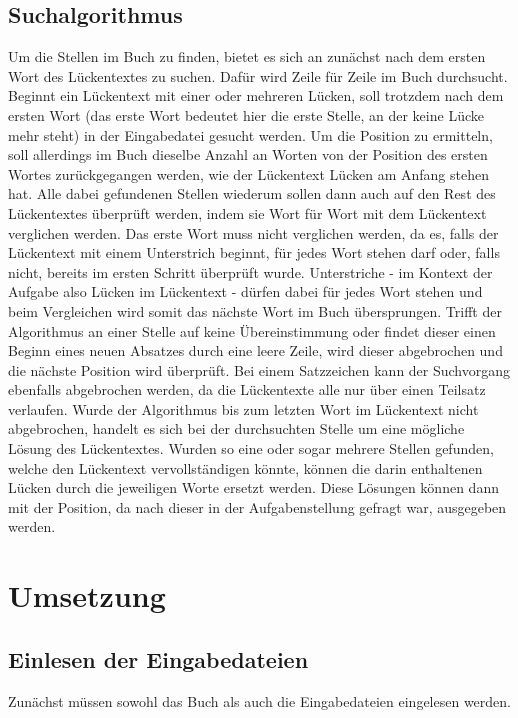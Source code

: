 \documentclass[a4paper, 10pt, ngerman]{scrartcl}
\begin{document}
\subsection{Suchalgorithmus}\label{sec:suchalgorithmus}
Um die Stellen im Buch zu finden,
bietet es sich an zunächst nach dem ersten Wort des Lückentextes zu suchen.
Dafür wird Zeile für Zeile im Buch durchsucht.
Beginnt ein Lückentext mit einer oder mehreren Lücken,
soll trotzdem nach dem ersten Wort
(das erste Wort bedeutet hier die erste Stelle,
an der keine Lücke mehr steht)
in der Eingabedatei gesucht werden.
Um die Position zu ermitteln,
soll allerdings im Buch dieselbe Anzahl an Worten von der Position des ersten Wortes zurückgegangen werden,
wie der Lückentext Lücken am Anfang stehen hat.
Alle dabei gefundenen Stellen wiederum sollen dann auch auf den Rest des Lückentextes überprüft werden,
indem sie Wort für Wort mit dem Lückentext verglichen werden.
Das erste Wort muss nicht verglichen werden,
da es,
falls der Lückentext mit einem Unterstrich beginnt,
für jedes Wort stehen darf
oder,
falls nicht,
bereits im ersten Schritt überprüft wurde.
Unterstriche
- im Kontext der Aufgabe also Lücken im Lückentext -
dürfen dabei für jedes Wort stehen
und beim Vergleichen wird somit das nächste Wort im Buch übersprungen.
Trifft der Algorithmus an einer Stelle auf keine Übereinstimmung
oder findet dieser einen Beginn eines neuen Absatzes durch eine leere Zeile,
wird dieser abgebrochen
und die nächste Position wird überprüft.
Bei einem Satzzeichen kann der Suchvorgang ebenfalls abgebrochen werden,
da die Lückentexte alle nur über einen Teilsatz verlaufen.
Wurde der Algorithmus bis zum letzten Wort im Lückentext nicht abgebrochen,
handelt es sich bei der durchsuchten Stelle um eine mögliche Lösung des Lückentextes.
Wurden so eine oder sogar mehrere Stellen gefunden,
welche den Lückentext vervollständigen könnte,
können die darin enthaltenen Lücken durch die jeweiligen Worte ersetzt werden.
Diese Lösungen können dann mit der Position,
da nach dieser in der Aufgabenstellung gefragt war,
ausgegeben werden.


\section{Umsetzung}\label{sec:umsetzung}
\subsection{Einlesen der Eingabedateien}
Zunächst müssen sowohl das Buch als auch die Eingabedateien eingelesen werden.
		
\end{document}

